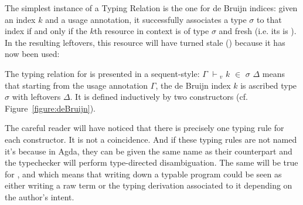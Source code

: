 The simplest instance of a Typing Relation is the one for de Bruijn
indices: given an index $k$ and a usage annotation, it successfully
associates a type $\ensuremath{\sigma}$ to that index if and only if the $k$th resource
in context is of type $\ensuremath{\sigma}$ and fresh (i.e. its \Usage{\ensuremath{\sigma}} is \fresh{\ensuremath{\sigma}}).
In the resulting leftovers, this resource will have turned stale (\stale{\ensuremath{\sigma}})
because it has now been used:

\begin{definition}
The typing relation for \Var{} is presented in a sequent-style: \ensuremath{\Gamma} \ensuremath{\vdash}$_v$ $k$ \ensuremath{\in} \ensuremath{\sigma} \andalso{} \ensuremath{\Delta}
means that starting from the usage annotation \ensuremath{\Gamma}, the de Bruijn index
$k$ is ascribed type \ensuremath{\sigma} with leftovers \ensuremath{\Delta}. It is defined inductively by
two constructors (cf. Figure~\ref{figure:deBruijn}).
\end{definition}



\begin{remark}The careful reader will have noticed that there is precisely
one typing rule for each \Var{} constructor. It is not a coincidence. And
if these typing rules are not named it's because in Agda, they can
be given the same name as their \Var{} counterpart and the typechecker will
perform type-directed disambiguation. The same will be true for \Inferable{},
\Checkable{} and \Pattern{} which means that writing down a typable program
could be seen as either writing a raw term or the typing derivation associated
to it depending on the author's intent.
\end{remark}

